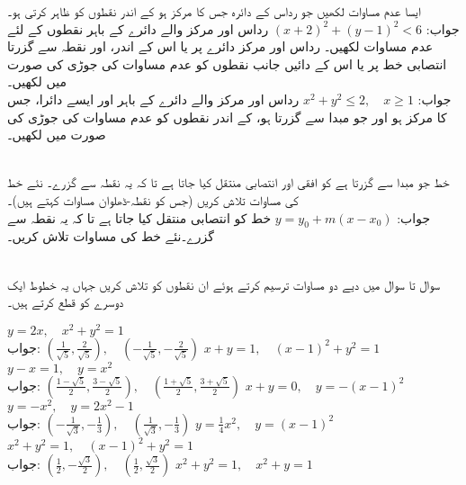 ایسا عدم مساوات لکھیں جو رداس  کے دائرہ جس کا مرکز  ہو کے اندر نقطوں کو ظاہر کرتی ہو۔\\
جواب:\quad
$(x+2)^2+(y-1)^2<6$
رداس  اور مرکز  والے دائرے کے باہر نقطوں کے لئے عدم مساوات لکھیں۔
رداس  اور مرکز  دائرے پر یا اس کے اندر، اور نقطہ   سے گزرتا انتصابی خط پر یا اس کے دائیں جانب نقطوں کو عدم مساوات کی جوڑی کی صورت میں لکھیں۔\\
جواب:\quad
$x^2+y^2\le 2,\quad x\ge 1$
رداس  اور مرکز والے  دائرے کے باہر اور ایسے دائرا، جس کا مرکز  ہو اور جو مبدا سے گزرتا ہو، کے اندر نقطوں کو عدم مساوات کی جوڑی کی صورت میں لکھیں۔

\\

خط  جو مبدا سے گزرتا ہے کو افقی اور انتصابی منتقل کیا جاتا ہے تا کہ یہ نقطہ  سے گزرے۔ نئے خط کی مساوات تلاش کریں (جس کو نقطہ-ڈھلوان مساوات کہتے ہیں)۔\\
جواب:\quad
$y=y_0+m(x-x_0)$
خط  کو انتصابی منتقل کیا جاتا ہے تا کہ یہ نقطہ  سے گزرے۔نئے خط کی مساوات تلاش کریں۔

\\

سوال  تا سوال  میں دیے دو مساوات ترسیم کرتے ہوئے ان نقطوں کو تلاش کریں جہاں یہ خطوط ایک دوسرے کو قطع کرتے ہیں۔

$y=2x,\quad x^2+y^2=1$\\
جواب:\quad
$(\tfrac{1}{\sqrt{5}},\tfrac{2}{\sqrt{5}}),\quad (-\tfrac{1}{\sqrt{5}},-\tfrac{2}{\sqrt{5}})$
$x+y=1,\quad (x-1)^2+y^2=1$
$y-x=1,\quad y=x^2$\\
جواب:\quad
$(\tfrac{1-\sqrt{5}}{2},\tfrac{3-\sqrt{5}}{2}),\quad (\tfrac{1+\sqrt{5}}{2},\tfrac{3+\sqrt{5}}{2})$
$x+y=0,\quad y=-(x-1)^2$
$y=-x^2,\quad y=2x^2-1$\\
جواب:\quad
$(-\tfrac{1}{\sqrt{3}},-\tfrac{1}{3}),\quad (\tfrac{1}{\sqrt{3}},-\tfrac{1}{3})$
$y=\tfrac{1}{4}x^2,\quad y=(x-1)^2$
$x^2+y^2=1,\quad (x-1)^2+y^2=1$\\
جواب:\quad
$(\tfrac{1}{2},-\tfrac{\sqrt{3}}{2}),\quad (\tfrac{1}{2},\tfrac{\sqrt{3}}{2})$
$x^2+y^2=1,\quad x^2+y=1$

